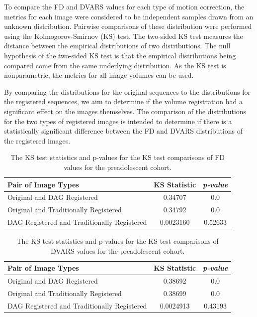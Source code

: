 To compare the FD and DVARS values for each type of motion correction, the metrics for each image were considered to be independent samples drawn from an unknown distribution. Pairwise comparisons of these distribution were performed using the Kolmogorov-Smirnov (KS) test. The two-sided KS test measures the distance between the empirical distributions of two distributions. The null hypothesis of the two-sided KS test is that the empirical distributions being compared come from the same underlying distribution. As the KS test is nonparametric, the metrics for all image volumes can be used.

By comparing the distributions for the original sequences to the distributions for the registered sequences, we aim to determine if the volume registration had a significant effect on the images themselves. The comparison of the distributions for the two types of registered images is intended to determine if there is a statistically significant difference between the FD and DVARS distributions of the registered images.

\begin{table}[ht]
\centering
\caption{The KS test statistics and p-values for the KS test comparisons of FD values for the preadolescent cohort.}
\label{tab:pread-ks-fd}
\begin{tabular}{|l|c|c|}
\hline
\textbf{Pair of Image Types} & \multicolumn{1}{l|}{\textbf{KS Statistic}} & \multicolumn{1}{l|}{\textit{\textbf{p-value}}} \\ \hline
Original and DAG Registered                 & 0.34707   & 0.0     \\ \hline
Original and Traditionally Registered       & 0.34792   & 0.0     \\ \hline
DAG Registered and Traditionally Registered & 0.0023160 & 0.52633 \\ \hline
\end{tabular}
\end{table}

\begin{table}[ht]
\centering
\caption{The KS test statistics and p-values for the KS test comparisons of DVARS values for the preadolescent cohort.}
\label{tab:pread-ks-dvars}
\begin{tabular}{|l|c|c|}
\hline
\textbf{Pair of Image Types} & \multicolumn{1}{l|}{\textbf{KS Statistic}} & \multicolumn{1}{l|}{\textit{\textbf{p-value}}} \\ \hline
Original and DAG Registered                 & 0.38692   & 0.0     \\ \hline
Original and Traditionally Registered       & 0.38699   & 0.0     \\ \hline
DAG Registered and Traditionally Registered & 0.0024913 & 0.43193 \\ \hline
\end{tabular}
\end{table}

